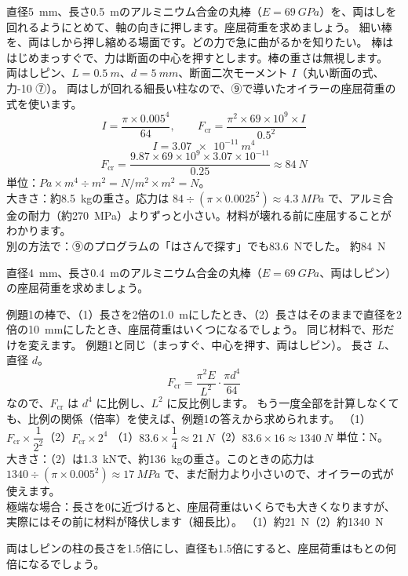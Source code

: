 \begin{phreidai}[アルミ棒の座屈荷重]
\label{ph:力-11:ex1}直径\qty{5}{mm}、長さ\qty{0.5}{m}のアルミニウム合金の丸棒（$E=\qty{69}{GPa}$）を、両はしを回れるようにとめて、軸の向きに押します。座屈荷重を求めましょう。
\phbamen
細い棒を、両はしから押し縮める場面です。どの力で急に曲がるかを知りたい。
\phmushi
棒ははじめまっすぐで、力は断面の中心を押すとします。棒の重さは無視します。
\phzu
両はしピン、$L=\qty{0.5}{m}$、$d=\qty{5}{mm}$、断面二次モーメント $I$（丸い断面の式、力-10 ⑦）。
\phriyu
両はしが回れる細長い柱なので、⑨で導いたオイラーの座屈荷重の式を使います。
\phtateru
\[ I=\frac{\pi\times0.005^4}{64},\qquad F_{\mathrm{cr}}=\frac{\pi^2\times69\times10^9\times I}{0.5^2} \]
\phtoku
\[ I=\qty{3.07e-11}{m^4} \]
\[ F_{\mathrm{cr}}=\frac{9.87\times69\times10^9\times3.07\times10^{-11}}{0.25}\approx\qty{84}{N} \]
\phtashikame
単位：$\unit{Pa}\times\unit{m^4}\div\unit{m^2}=\unit{N/m^2}\times\unit{m^2}=\unit{N}$。\\
大きさ：約\qty{8.5}{kg}の重さ。応力は $84\div(\pi\times0.0025^2)\approx\qty{4.3}{MPa}$ で、アルミ合金の耐力（約\qty{270}{MPa}）よりずっと小さい。材料が壊れる前に座屈することがわかります。\\
別の方法で：⑨のプログラムの「はさんで探す」でも\qty{83.6}{N}でした。
\kotae 約\qty{84}{N}
\end{phreidai}
\begin{jibun}
直径\qty{4}{mm}、長さ\qty{0.4}{m}のアルミニウム合金の丸棒（$E=\qty{69}{GPa}$、両はしピン）の座屈荷重を求めましょう。
\end{jibun}

\begin{phreidai}[長さ・太さを変えると座屈荷重は？]
\label{ph:力-11:ex2}例題1の棒で、（1）長さを2倍の\qty{1.0}{m}にしたとき、（2）長さはそのままで直径を2倍の\qty{10}{mm}にしたとき、座屈荷重はいくつになるでしょう。
\phbamen
同じ材料で、形だけを変えます。
\phmushi
例題1と同じ（まっすぐ、中心を押す、両はしピン）。
\phzu
長さ $L$、直径 $d$。
\[F_{\mathrm{cr}}=\frac{\pi^2E}{L^2}\cdot\frac{\pi d^4}{64}\]
なので、$F_{\mathrm{cr}}$ は $d^4$ に比例し、$L^2$ に反比例します。
\phriyu
もう一度全部を計算しなくても、比例の関係（倍率）を使えば、例題1の答えから求められます。
\phtateru
（1）$F_{\mathrm{cr}}\times\dfrac{1}{2^2}$\qquad（2）$F_{\mathrm{cr}}\times2^4$
\phtoku
（1）$83.6\times\dfrac{1}{4}\approx\qty{21}{N}$\qquad（2）$83.6\times16\approx\qty{1340}{N}$
\phtashikame
単位：N。\\
大きさ：（2）は\qty{1.3}{kN}で、約\qty{136}{kg}の重さ。このときの応力は $1340\div(\pi\times0.005^2)\approx\qty{17}{MPa}$ で、まだ耐力より小さいので、オイラーの式が使えます。\\
極端な場合：長さを0に近づけると、座屈荷重はいくらでも大きくなりますが、実際にはその前に材料が降伏します（細長比）。
\kotae （1）約\qty{21}{N}\quad（2）約\qty{1340}{N}
\end{phreidai}
\begin{jibun}
両はしピンの柱の長さを1.5倍にし、直径も1.5倍にすると、座屈荷重はもとの何倍になるでしょう。
\end{jibun}

